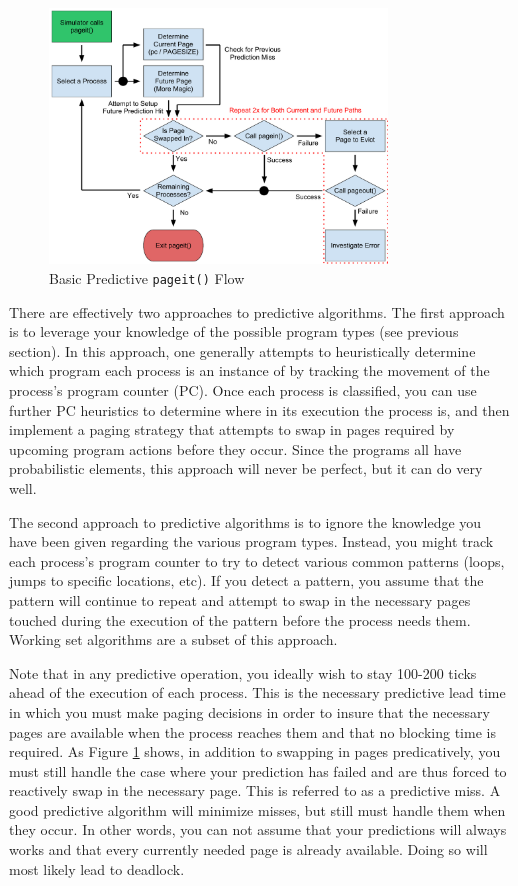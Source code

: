 \documentclass[12pt]{article}
\begin{document}
\begin{figure}[htbp]
  \begin{center}
    \includegraphics[width=0.8\textwidth]{pageit-Fig2.pdf}
    \caption{Basic Predictive \texttt{pageit()} Flow}
    \label{fig:pageit-predictive}
  \end{center}
\end{figure}

There are effectively two approaches to predictive algorithms. The
first approach is to leverage your knowledge of the possible program
types (see previous section). In this approach, one generally attempts
to heuristically determine which program each process is an instance of
by tracking the movement of the process's program counter (PC). Once each
process is classified, you can use further PC heuristics to determine where
in its execution the process is, and then implement a paging strategy
that attempts to swap in pages required by upcoming program actions
before they occur. Since the programs all have probabilistic elements,
this approach will never be perfect, but it can do very well.

The second approach to predictive algorithms is to ignore the
knowledge you have been given regarding the various program
types. Instead, you might track each process's program counter to try
to detect various common patterns (loops, jumps to specific locations,
etc). If you detect a pattern, you assume that the pattern will continue to
repeat and attempt to swap in the necessary pages touched during the
execution of the pattern before the process needs them.
Working set algorithms are a subset of this approach.

Note that in any predictive operation, you ideally wish to stay
100-200 ticks ahead of the execution of each process. This is the
necessary predictive lead time in which you must make paging decisions
in order to insure that the necessary pages are available when the
process reaches them and that no blocking time is required. As Figure
\ref{fig:pageit-predictive} shows, in addition to swapping in pages
predicatively, you must still handle the case where your prediction has
failed and are thus forced to reactively swap in the necessary
page. This is referred to as a predictive miss. A good predictive
algorithm will minimize misses, but still must handle them when they
occur. In other words, you can not assume that your predictions will
always works and that every currently needed page is already
available. Doing so will most likely lead to deadlock.
\end{document}
